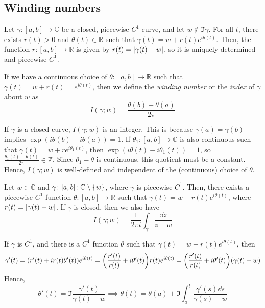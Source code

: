 \subsection{Winding numbers}
Let \( \gamma \colon [a,b] \to \mathbb C \) be a closed, piecewise \( C^1 \) curve, and let \( w \not\in \Im \gamma \).
For all \( t \), there exists \( r(t) > 0 \) and \( \theta(t) \in \mathbb R \) such that \( \gamma(t) = w + r(t) e^{i\theta(t)} \).
Then, the function \( r \colon [a,b] \to \mathbb R \) is given by \( r(t) = \abs{\gamma(t) - w} \), so it is uniquely determined and piecewise \( C^1 \).
\begin{definition}
	If we have a continuous choice of \( \theta \colon [a,b] \to \mathbb R \) such that \( \gamma(t) = w + r(t) = e^{i\theta(t)} \), then we define the \textit{winding number} or the \textit{index} of \( \gamma \) about \( w \) as
	\[ I(\gamma; w) = \frac{\theta(b) - \theta(a)}{2\pi} \]
\end{definition}
If \( \gamma \) is a closed curve, \( I(\gamma;w) \) is an integer.
This is because \( \gamma(a) = \gamma(b) \) implies \( \exp(i\theta(b) - i\theta(a)) = 1 \).
If \( \theta_1 \colon [a,b] \to \mathbb C \) is also continuous such that \( \gamma(t) = w + re^{i\theta_1(t)} \), then \( \exp(i\theta(t) - i\theta_1(t)) = 1 \), so \( \frac{\theta_1(t) - \theta(t)}{2\pi} \in \mathbb Z \).
Since \( \theta_1 - \theta \) is continuous, this quotient must be a constant.
Hence, \( I(\gamma;w) \) is well-defined and independent of the (continuous) choice of \( \theta \).
\begin{lemma}
	Let \( w \in \mathbb C \) and \( \gamma \colon [a,b] \colon \mathbb C \setminus \qty{w} \), where \( \gamma \) is piecewise \( C^1 \).
	Then, there exists a piecewise \( C^1 \) function \( \theta \colon [a,b] \to \mathbb R \) such that \( \gamma(t) = w + r(t) e^{i\theta(t)} \), where \( r(t) = \abs{\gamma(t) - w} \).
	If \( \gamma \) is closed, then we also have
	\[ I(\gamma; w) = \frac{1}{2\pi i} \int_\gamma \frac{\dd{z}}{z-w} \]
\end{lemma}
\begin{remark}
	If \( \gamma \) is \( C^1 \), and there is a \( C^1 \) function \( \theta \) such that \( \gamma(t) = w + r(t) e^{i\theta(t)} \), then
	\[ \gamma'(t) = (r'(t) + ir(t) \theta'(t))e^{i\theta(t)} = \qty(\frac{r'(t)}{r(t)} + i\theta'(t)) r(t) e^{i\theta(t)} = \qty(\frac{r'(t)}{r(t)} + i\theta'(t))(\gamma(t) - w) \]
	Hence,
	\[ \theta'(t) = \Im \frac{\gamma'(t)}{\gamma(t) - w} \implies \theta(t) = \theta(a) + \Im \int_a^t \frac{\gamma'(s) \dd{s}}{\gamma(s) - w} \]
\end{remark}
